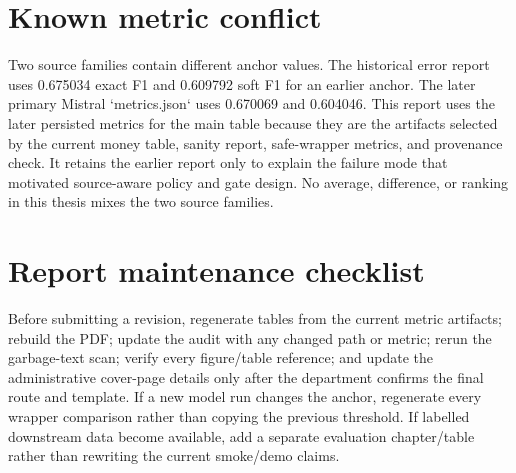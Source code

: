 \section{Known metric conflict}

Two source families contain different anchor values. The historical error report uses 0.675034 exact F1 and 0.609792 soft F1 for an earlier anchor. The later primary Mistral `metrics.json` uses 0.670069 and 0.604046. This report uses the later persisted metrics for the main table because they are the artifacts selected by the current money table, sanity report, safe-wrapper metrics, and provenance check. It retains the earlier report only to explain the failure mode that motivated source-aware policy and gate design. No average, difference, or ranking in this thesis mixes the two source families.

\section{Report maintenance checklist}

Before submitting a revision, regenerate tables from the current metric artifacts; rebuild the PDF; update the audit with any changed path or metric; rerun the garbage-text scan; verify every figure/table reference; and update the administrative cover-page details only after the department confirms the final route and template. If a new model run changes the anchor, regenerate every wrapper comparison rather than copying the previous threshold. If labelled downstream data become available, add a separate evaluation chapter/table rather than rewriting the current smoke/demo claims.
